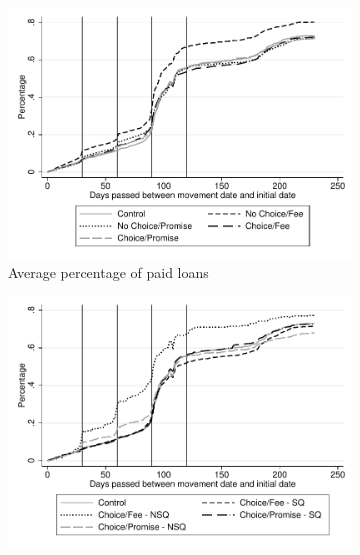 \documentclass[11pt]{article}
\begin{document}
\begin{figure}[H]
\begin{center}
     \begin{subfigure}{0.49\textwidth}
        \caption{Average percentage of paid loans}
        \centering
        \includegraphics[width=\textwidth]{Figuras/sum_porc_evol.pdf}
    \end{subfigure}
     \begin{subfigure}{0.49\textwidth}
      \caption*{}
        \centering
        \includegraphics[width=\textwidth]{Figuras/sum_porc_evol_choice.pdf}
    \end{subfigure}
    

\end{center}
\end{figure}
\end{document}
